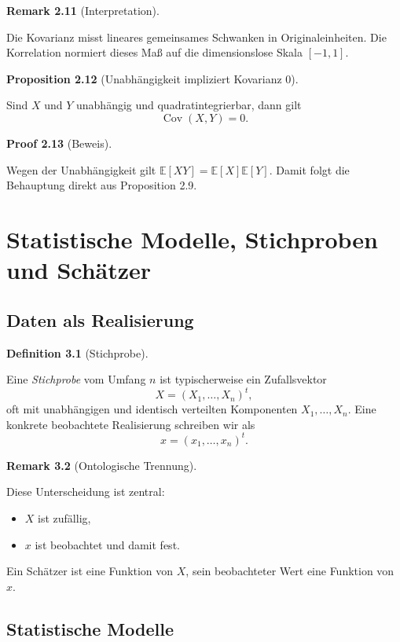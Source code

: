 \documentclass[10pt, letterpaper]{article}
\newcommand{\CustomHeading}[3]{%
  \par\medskip\noindent%
  \textbf{#1 #2} \textnormal{(#3)}.\enskip%
}
\newenvironment{DEF}[2]{\CustomHeading{Definition}{#1}{#2}}{}
\newenvironment{PROP}[2]{\CustomHeading{Proposition}{#1}{#2}}{}
\newenvironment{REM}[2]{\CustomHeading{Remark}{#1}{#2}}{}
\newenvironment{PROOF}[2]{\CustomHeading{Proof}{#1}{#2}}{}
\begin{document}
\begin{REM}{2.11}{Interpretation}
Die Kovarianz misst lineares gemeinsames Schwanken in Originaleinheiten. Die Korrelation normiert dieses Maß auf die dimensionslose Skala \([-1,1]\).
\end{REM}

\begin{PROP}{2.12}{Unabhängigkeit impliziert Kovarianz \(0\)}
Sind \(X\) und \(Y\) unabhängig und quadratintegrierbar, dann gilt
\[
\operatorname{Cov}(X,Y)=0.
\]
\end{PROP}

\begin{PROOF}{2.13}{Beweis}
Wegen der Unabhängigkeit gilt \(\mathbb E[XY]=\mathbb E[X]\mathbb E[Y]\). Damit folgt die Behauptung direkt aus Proposition 2.9.
\end{PROOF}

\section{Statistische Modelle, Stichproben und Schätzer}

\subsection{Daten als Realisierung}

\begin{DEF}{3.1}{Stichprobe}
Eine \emph{Stichprobe} vom Umfang \(n\) ist typischerweise ein Zufallsvektor
\[
X=(X_1,\dots,X_n)^t,
\]
oft mit unabhängigen und identisch verteilten Komponenten \(X_1,\dots,X_n\).
Eine konkrete beobachtete Realisierung schreiben wir als
\[
x=(x_1,\dots,x_n)^t.
\]
\end{DEF}

\begin{REM}{3.2}{Ontologische Trennung}
Diese Unterscheidung ist zentral:
\begin{itemize}
    \item \(X\) ist zufällig,
    \item \(x\) ist beobachtet und damit fest.
\end{itemize}
Ein Schätzer ist eine Funktion von \(X\), sein beobachteter Wert eine Funktion von \(x\).
\end{REM}

\subsection{Statistische Modelle}
\end{document}

